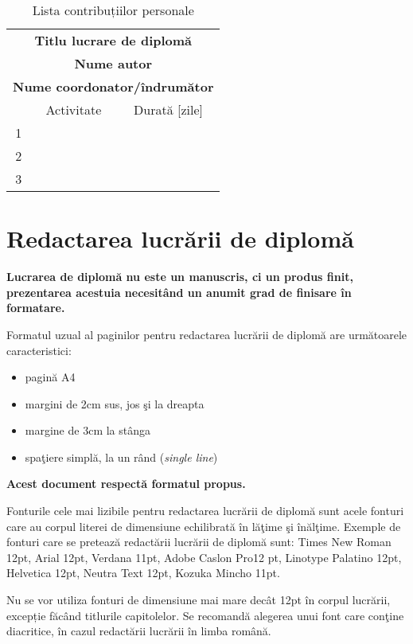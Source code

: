 \begin{table}[ht!]
\begin{tabular}{|c|c|c|}
\hline
\multicolumn{3}{|c|}{\textbf{Titlu lucrare de diplomă}} \\
\multicolumn{3}{|c|}{\textbf{Nume autor}} \\
\multicolumn{3}{|c|}{\textbf{Nume coordonator/îndrumător}} \\
\hline
 & Activitate & Durată [zile] \\
\hline
1 & \hspace*{12cm} & \\
\hline
2 &  & \\
\hline
3 &  & \\
\hline
\end{tabular}
\centering
\caption{Lista contribuțiilor personale}
\label{tab:lista_contrib}
\end{table}

\section{Redactarea lucrării de diplomă}

\textbf{Lucrarea de diplomă nu este un manuscris, ci un produs finit, prezentarea acestuia necesitând un anumit grad de finisare în formatare.}

Formatul uzual al paginilor pentru redactarea lucrării de diplomă are următoarele caracteristici:

\begin{itemize}
\item pagină A4
\item 	margini de 2cm sus, jos \c si la dreapta
\item  margine de 3cm la stânga
\item spaţiere simplă, la un rând (\emph{single line})
\end{itemize}

\textbf{Acest document respectă formatul propus.}

Fonturile cele mai lizibile pentru redactarea lucrării de diplomă sunt acele
fonturi care au corpul literei de dimensiune echilibrată în lăţime şi înălţime. Exemple de fonturi care se pretează redactării lucrării de diplomă sunt: Times New Roman 12pt, Arial 12pt, Verdana 11pt, Adobe Caslon Pro12 pt, Linotype Palatino 12pt, Helvetica 12pt, Neutra Text 12pt, Kozuka Mincho 11pt.

Nu se vor utiliza fonturi de dimensiune mai mare decât 12pt în corpul lucrării, excepție făcând titlurile capitolelor. Se recomandă alegerea unui font care conţine diacritice, în cazul redactării lucrării în limba română.

